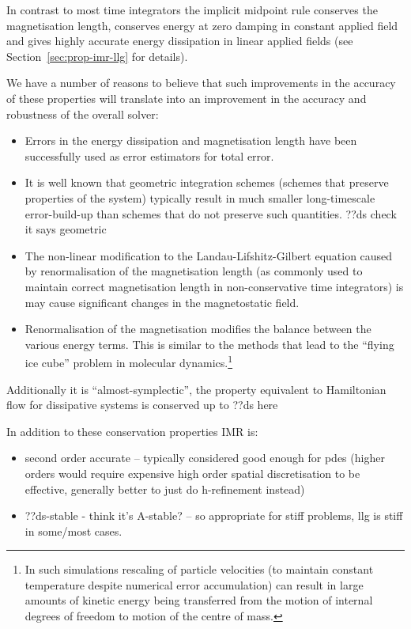 In contrast to most time integrators the implicit midpoint rule conserves the magnetisation length, conserves energy at zero damping in constant applied field and gives highly accurate energy dissipation in linear applied fields (see Section~\ref{sec:prop-imr-llg} for details).

We have a number of reasons to believe that such improvements in the accuracy of these properties will translate into an improvement in the accuracy and robustness of the overall solver:
\begin{itemize}
\item Errors in the energy dissipation\cite{Albuquerque2001} and magnetisation length\cite{Chantrell2001} have been successfully used as error estimators for total error.

\item It is well known that geometric integration schemes (\ie schemes that preserve properties of the system) typically result in much smaller long-timescale error-build-up than schemes that do not preserve such quantities.\cite{Iserles2009} ??ds check it says geometric

\item The non-linear modification to the Landau-Lifshitz-Gilbert equation caused by renormalisation of the magnetisation length (as commonly used to maintain correct magnetisation length in non-conservative time integrators) is may cause significant changes in the magnetostatic field.\cite{Lewis2003}

\item Renormalisation of the magnetisation modifies the balance between the various energy terms.
 This is similar to the methods that lead to the ``flying ice cube'' problem in molecular dynamics.\cite{Harvey1998}\footnote{In such simulations rescaling of particle velocities (to maintain constant temperature despite numerical error accumulation) can result in large amounts of kinetic energy being transferred from the motion of internal degrees of freedom to motion of the centre of mass.}
\end{itemize}

Additionally it is ``almost-symplectic'', \ie the property equivalent to Hamiltonian flow for  dissipative systems is conserved up to \cite{daquino2005}\cite{??ds-older-paper for this?} ??ds here

In addition to these conservation properties IMR is:
\begin{itemize}
\item second order accurate -- typically considered good enough for pdes (higher orders would require expensive high order spatial discretisation to be effective, generally better to just do h-refinement instead) \cite{Matthias}
\item ??ds-stable - think it's A-stable? \cite{??ds} -- so appropriate for stiff problems, llg is stiff in some/most cases\cite{??ds}.
\end{itemize}

